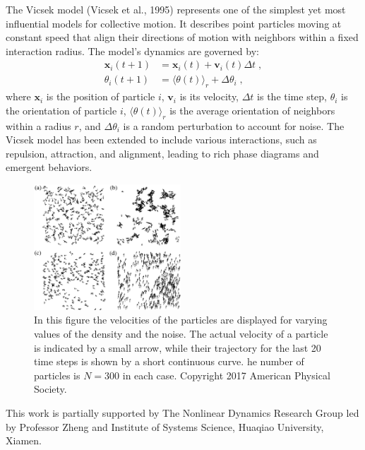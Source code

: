 \documentclass[a4paper, amsfonts, amssymb, amsmath, reprint, showkeys, showpacs, nofootinbib, twoside]{revtex4-2}
\begin{document}
The Vicsek model (Vicsek et al., 1995) represents one of the simplest yet most influential models for collective motion. It describes point particles moving at constant speed that align their directions of motion with neighbors within a fixed interaction radius. The model's dynamics are governed by:
\begin{subequations}
    \label{eq:agentsChemotaxis}
    \begin{align}
        \mathbf{x}_i\left( t+1 \right) &=\mathbf{x}_i\left( t \right) +\mathbf{v}_i\left( t \right) \Delta t\;,
        \\
        \theta_i \left( t+1 \right) &=\langle \theta \left( t \right) \rangle _r+\Delta \theta_i \;,
    \end{align}
\end{subequations}
where $\mathbf{x}_i$ is the position of particle $i$, $\mathbf{v}_i$ is its velocity, $\Delta t$ is the time step, $\theta_i$ is the orientation of particle $i$, $\langle \theta \left( t \right) \rangle _r$ is the average orientation of neighbors within a radius $r$, and $\Delta \theta_i$ is a random perturbation to account for noise. The Vicsek model has been extended to include various interactions, such as repulsion, attraction, and alignment, leading to rich phase diagrams and emergent behaviors.

\begin{figure}
    \includegraphics[width=0.49\textwidth]{./figs/vicsekSnapshots.png}
    \caption{
        \label{fig:vicsekSnapshots}
        In this figure the velocities of the particles are displayed for varying values of the density and the noise.
        The actual velocity of a particle is indicated by a small arrow, while their trajectory for the last 20 time steps is shown by a short continuous curve. he number of particles is $N = 300$ in each case. Copyright 2017 American Physical Society.
    }
\end{figure}



\begin{acknowledgments}
This work is partially supported by The Nonlinear Dynamics Research Group led by Professor Zheng and Institute of Systems Science, Huaqiao University, Xiamen.
\end{acknowledgments}


\end{document}
